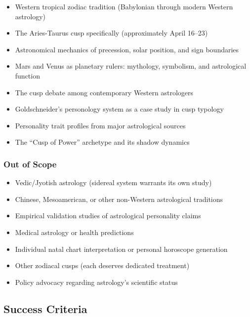 \documentclass[11pt,letterpaper]{article}
\begin{document}
\begin{itemize}[leftmargin=2em]
\item Western tropical zodiac tradition (Babylonian through modern Western astrology)
\item The Aries-Taurus cusp specifically (approximately April 16--23)
\item Astronomical mechanics of precession, solar position, and sign boundaries
\item Mars and Venus as planetary rulers: mythology, symbolism, and astrological function
\item The cusp debate among contemporary Western astrologers
\item Goldschneider's personology system as a case study in cusp typology
\item Personality trait profiles from major astrological sources
\item The ``Cusp of Power'' archetype and its shadow dynamics
\end{itemize}

\subsubsection{Out of Scope}

\begin{itemize}[leftmargin=2em]
\item Vedic/Jyotish astrology (sidereal system warrants its own study)
\item Chinese, Mesoamerican, or other non-Western astrological traditions
\item Empirical validation studies of astrological personality claims
\item Medical astrology or health predictions
\item Individual natal chart interpretation or personal horoscope generation
\item Other zodiacal cusps (each deserves dedicated treatment)
\item Policy advocacy regarding astrology's scientific status
\end{itemize}

\subsection{Success Criteria}
\end{document}
